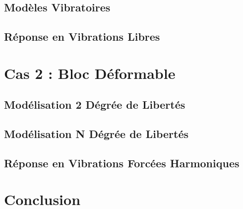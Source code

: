 \documentclass[a4paper,10pt]{report}
\begin{document}

\subsection{Modèles Vibratoires}
\label{sub : ModVib}




\subsection{Réponse en Vibrations Libres}
\label{sub : RepVibLib}




\section{Cas 2 : Bloc Déformable}
\label{sec : Déf}




\subsection{Modélisation 2 Dégrée de Libertés}
\label{sub : 2DDL}




\subsection{Modélisation N Dégrée de Libertés}
\label{sub : NDDL}




\subsection{Réponse en Vibrations Forcées Harmoniques}
\label{sub : RepVibFor}




\section{Conclusion}
\label{sec : Ccl}
\end{document}
